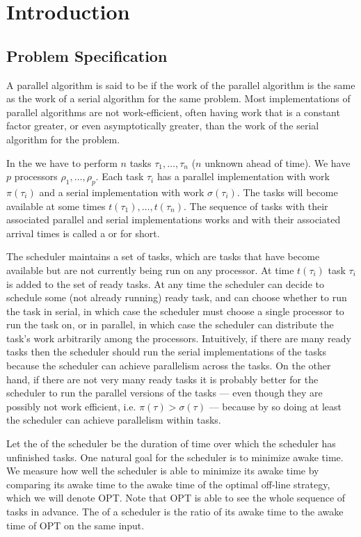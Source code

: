 \section{Introduction}
\label{sec:intro}
\subsection{Problem Specification}
A parallel algorithm is said to be  if the
work of the parallel algorithm is the same as the work of a
serial algorithm for the same problem. Most implementations of
parallel algorithms are not work-efficient, often having work
that is a constant factor greater, or even asymptotically
greater, than the work of the serial algorithm for the problem.

In the  we have to
perform $n$ tasks $\tau_1, \ldots, \tau_n$ ($n$ unknown ahead of
time). We have $p$ processors $\rho_1, \ldots, \rho_p$. Each task
$\tau_i$ has a parallel implementation with work $\pi(\tau_i)$ and a
serial implementation with work $\sigma(\tau_i)$. The tasks will become
available at some times $t(\tau_1), \ldots, t(\tau_n)$. 
The sequence of tasks with their associated parallel and serial
implementations works and with their associated arrival times is
called a  or  for short.

The scheduler maintains a set of  tasks, which are
tasks that have become available but are not currently being run
on any processor. At time $t(\tau_i)$ task $\tau_i$ is added to
the set of ready tasks. At any time the scheduler can decide to
schedule some (not already running) ready task, and can choose
whether to run the task in serial, in which case the scheduler
must choose a single processor to run the task on, or in
parallel, in which case the scheduler can distribute the task's
work arbitrarily among the processors. Intuitively, if there are
many ready tasks then the scheduler should run the serial
implementations of the tasks because the scheduler can achieve
parallelism across the tasks. On the other hand, if there are not
very many ready tasks it is probably better for the scheduler to
run the parallel versions of the tasks --- even though they are
possibly not work efficient, i.e. $\pi(\tau) > \sigma(\tau)$ ---
because by so doing at least the scheduler can achieve
parallelism within tasks.

Let the  of the scheduler be the duration of
time over which the scheduler has unfinished tasks. One natural
goal for the scheduler is to minimize awake time. We measure how
well the scheduler is able to minimize its awake time by
comparing its awake time to the awake time of the optimal
off-line strategy, which we will denote OPT. Note that OPT is
able to see the whole sequence of tasks in advance. The
 of a scheduler is the ratio of its awake
time to the awake time of OPT on the same input.

